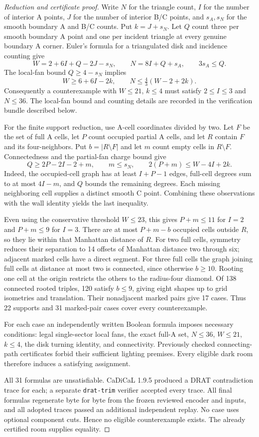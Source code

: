 \documentclass[11pt]{article}
\theoremstyle{definition}\newtheorem{definition}[theorem]{Definition}
\begin{document}
\begin{proof}[Reduction and certificate proof]
Write $N$ for the triangle count, $I$ for the number of interior A points, $J$ for the number of interior B/C points, and $s_A,s_N$ for the smooth boundary A and B/C counts. Put $k=J+s_N$. Let $Q$ count three per smooth boundary A point and one per incident triangle at every genuine boundary A corner. Euler's formula for a triangulated disk and incidence counting give
\[
 W=2+6I+Q-2J-s_N,\qquad N=8I+Q+s_A,\qquad 3s_A\le Q.
\]
The local-fan bound $Q\ge4-s_N$ implies
\[
 W\ge6+6I-2k,\qquad
 N\le\tfrac43(W-2+2k).
\]
Consequently a counterexample with $W\le21$, $k\le4$ must satisfy $2\le I\le3$ and $N\le36$. The local-fan bound and counting details are recorded in the verification bundle described below.

For the finite support reduction, use A-cell coordinates divided by two. Let $F$ be the set of full A cells, let $P$ count occupied partial A cells, and let $R$ contain $F$ and its four-neighbors. Put $b=|R\setminus F|$ and let $m$ count empty cells in $R\setminus F$. Connectedness and the partial-fan charge bound give
\[
 Q\ge2P-2I-2+m,\qquad m\le s_N,\qquad
 2(P+m)\le W-4I+2k.
\]
Indeed, the occupied-cell graph has at least $I+P-1$ edges, full-cell degrees sum to at most $4I-m$, and $Q$ bounds the remaining degrees. Each missing neighboring cell supplies a distinct smooth C point. Combining these observations with the wall identity yields the last inequality.

Even using the conservative threshold $W\le23$, this gives $P+m\le11$ for $I=2$ and $P+m\le9$ for $I=3$. There are at most $P+m-b$ occupied cells outside $R$, so they lie within that Manhattan distance of $R$. For two full cells, symmetry reduces their separation to 14 offsets of Manhattan distance two through six; adjacent marked cells have a direct segment. For three full cells the graph joining full cells at distance at most two is connected, since otherwise $b\ge10$. Rooting one cell at the origin restricts the others to the radius-four diamond. Of 138 connected rooted triples, 120 satisfy $b\le9$, giving eight shapes up to grid isometries and translation. Their nonadjacent marked pairs give 17 cases. Thus 22 supports and 31 marked-pair cases cover every counterexample.

For each case an independently written Boolean formula imposes necessary conditions: legal single-sector local fans, the exact full-A set, $N\le36$, $W\le21$, $k\le4$, the disk turning identity, and connectivity. Previously checked connecting-path certificates forbid their sufficient lighting premises. Every eligible dark room therefore induces a satisfying assignment.

All 31 formulas are unsatisfiable. CaDiCaL 1.9.5 produced a DRAT contradiction trace for each; a separate \texttt{drat-trim} verifier accepted every trace. All final formulas regenerate byte for byte from the frozen reviewed encoder and inputs, and all adopted traces passed an additional independent replay. No case uses optional component cuts. Hence no eligible counterexample exists. The already certified room supplies equality.
\end{proof}
\end{document}
